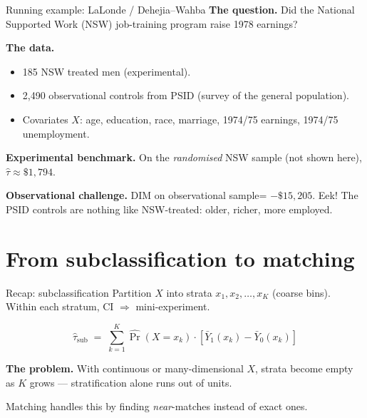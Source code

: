 \documentclass[xcolor=dvipsnames]{beamer}
\begin{document}
\begin{frame}{Running example: LaLonde / Dehejia--Wahba}
\small
{} \textbf{The question.} Did the National Supported Work (NSW) job-training program raise 1978 earnings?

\medskip
{} \textbf{The data.}
\begin{itemize}
\item 185 NSW treated men (experimental).
\item 2,490 observational controls from PSID (survey of the general population).
\item Covariates $X$: age, education, race, marriage, 1974/75 earnings, 1974/75 unemployment.
\end{itemize}

\medskip
{} \textbf{Experimental benchmark.} On the \textit{randomised} NSW sample (not shown here), $\widehat{\tau} \approx \$1{,}794$.

\medskip
{} \textbf{Observational challenge.}  DIM on observational sample= $-\$15{,}205$. Eek! The PSID controls are nothing like NSW-treated: older, richer, more employed.
\end{frame}


\section{From subclassification to matching}

\begin{frame}{Recap: subclassification}
\small
{} Partition $X$ into strata $x_1, x_2, \ldots, x_K$ (coarse bins).\\
Within each stratum, CI $\Rightarrow$ mini-experiment.

\medskip
{}
$$\widehat{\tau}_{\text{sub}} \;=\; \sum_{k=1}^{K} \widehat{\Pr}(X = x_k)\cdot\left[\bar Y_1(x_k) - \bar Y_0(x_k)\right]$$

\medskip
{} \textbf{The problem.} With continuous or many-dimensional $X$, strata become empty as $K$ grows --- stratification alone runs out of units.

\medskip
{} Matching handles this by finding \textit{near}-matches instead of exact ones.
\end{frame}
\end{document}

